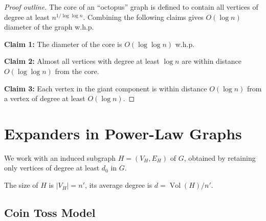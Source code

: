 \documentclass{beamer}
\DeclareMathOperator*{\Vol}{Vol}
\newcommand{\autotitle}{\secname\ifdefempty{\subsecname}{}{~--- \subsecname}}
\newcommand{\clearsubsecname}{\long\def\subsecname{}}
\begin{document}
\begin{frame}{\autotitle}
    \begin{proof}[Proof outline]
        The core of an ``octopus'' graph is defined to contain all vertices of degree
        at least $n^{1/\log\log n}$.
        Combining the following claims gives $O(\log n)$ diameter of the graph w.h.p.
        
        \textbf{Claim 1:} The diameter of the core is $O(\log\log n)$ w.h.p.
        
        \textbf{Claim 2:} Almost all vertices with degree at least $\log n$ are
        within distance $O(\log\log n)$ from the core.
        
        \textbf{Claim 3:} Each vertex in the giant component is within distance
        $O(\log n)$ from a vertex of degree at least $O(\log n)$.
    \end{proof}
\end{frame}

\section{Expanders in Power-Law Graphs}
\clearsubsecname

\begin{frame}{\autotitle}
    We work with an induced subgraph $H=(V_H,E_H)$ of $G$,
    obtained by retaining only vertices of degree at least $d_0$ in $G$.
    
    The size of $H$ is $|V_H|=n'$, its average degree is $d=\Vol(H)/n'$.
\end{frame}

\subsection{Coin Toss Model}
\end{document}
